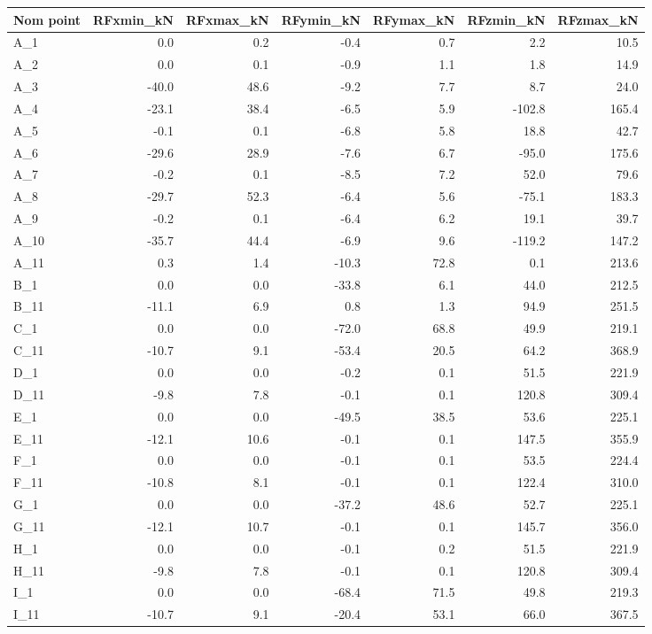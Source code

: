 \begin{tabular}{lrrrrrr}
\toprule
Nom point & RFxmin\_kN & RFxmax\_kN & RFymin\_kN & RFymax\_kN & RFzmin\_kN & RFzmax\_kN \\
\midrule
A\_1 & 0.0 & 0.2 & -0.4 & 0.7 & 2.2 & 10.5 \\
A\_2 & 0.0 & 0.1 & -0.9 & 1.1 & 1.8 & 14.9 \\
A\_3 & -40.0 & 48.6 & -9.2 & 7.7 & 8.7 & 24.0 \\
A\_4 & -23.1 & 38.4 & -6.5 & 5.9 & -102.8 & 165.4 \\
A\_5 & -0.1 & 0.1 & -6.8 & 5.8 & 18.8 & 42.7 \\
A\_6 & -29.6 & 28.9 & -7.6 & 6.7 & -95.0 & 175.6 \\
A\_7 & -0.2 & 0.1 & -8.5 & 7.2 & 52.0 & 79.6 \\
A\_8 & -29.7 & 52.3 & -6.4 & 5.6 & -75.1 & 183.3 \\
A\_9 & -0.2 & 0.1 & -6.4 & 6.2 & 19.1 & 39.7 \\
A\_10 & -35.7 & 44.4 & -6.9 & 9.6 & -119.2 & 147.2 \\
A\_11 & 0.3 & 1.4 & -10.3 & 72.8 & 0.1 & 213.6 \\
B\_1 & 0.0 & 0.0 & -33.8 & 6.1 & 44.0 & 212.5 \\
B\_11 & -11.1 & 6.9 & 0.8 & 1.3 & 94.9 & 251.5 \\
C\_1 & 0.0 & 0.0 & -72.0 & 68.8 & 49.9 & 219.1 \\
C\_11 & -10.7 & 9.1 & -53.4 & 20.5 & 64.2 & 368.9 \\
D\_1 & 0.0 & 0.0 & -0.2 & 0.1 & 51.5 & 221.9 \\
D\_11 & -9.8 & 7.8 & -0.1 & 0.1 & 120.8 & 309.4 \\
E\_1 & 0.0 & 0.0 & -49.5 & 38.5 & 53.6 & 225.1 \\
E\_11 & -12.1 & 10.6 & -0.1 & 0.1 & 147.5 & 355.9 \\
F\_1 & 0.0 & 0.0 & -0.1 & 0.1 & 53.5 & 224.4 \\
F\_11 & -10.8 & 8.1 & -0.1 & 0.1 & 122.4 & 310.0 \\
G\_1 & 0.0 & 0.0 & -37.2 & 48.6 & 52.7 & 225.1 \\
G\_11 & -12.1 & 10.7 & -0.1 & 0.1 & 145.7 & 356.0 \\
H\_1 & 0.0 & 0.0 & -0.1 & 0.2 & 51.5 & 221.9 \\
H\_11 & -9.8 & 7.8 & -0.1 & 0.1 & 120.8 & 309.4 \\
I\_1 & 0.0 & 0.0 & -68.4 & 71.5 & 49.8 & 219.3 \\
I\_11 & -10.7 & 9.1 & -20.4 & 53.1 & 66.0 & 367.5 \\

\end{tabular}

